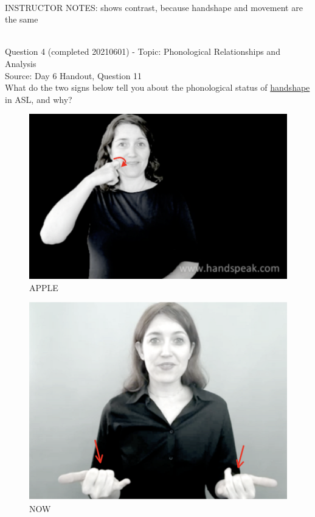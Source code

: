 \documentclass[12pt]{article}
\begin{document}
~\\
INSTRUCTOR NOTES: shows contrast, because handshape and movement are the same


~\\

{\large Question 4} (completed 20210601) - Topic: Phonological Relationships and Analysis\\
Source: Day 6 Handout, Question 11\\

What do the two signs below tell you about the phonological status of \underline{handshape} in ASL, and why?\\

\begin{figure}[H]
\includegraphics{../images/asl_apple.png}
\caption{APPLE}
\end{figure}
\begin{figure}[H]
\includegraphics{../images/asl_now.png}
\caption{NOW}
\end{figure}
\end{document}
